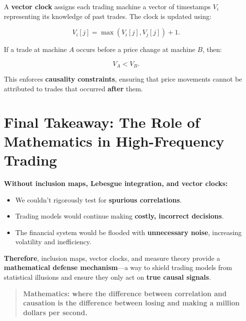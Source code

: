 A \textbf{vector clock} assigns each trading machine a vector of timestamps \( V_i \) representing its knowledge of past trades. The clock is updated using:

\[
V_i[j] = \max(V_i[j], V_j[j]) + 1.
\]

If a trade at machine \( A \) occurs before a price change at machine \( B \), then:

\[
V_A < V_B.
\]

This enforces \textbf{causality constraints}, ensuring that price movements cannot be attributed to trades that occurred \textbf{after} them.

\section{Final Takeaway: The Role of Mathematics in High-Frequency Trading}

\textbf{Without inclusion maps, Lebesgue integration, and vector clocks:}
\begin{itemize}
    \item We couldn’t rigorously test for \textbf{spurious correlations}.
    \item Trading models would continue making \textbf{costly, incorrect decisions}.
    \item The financial system would be flooded with \textbf{unnecessary noise}, increasing volatility and inefficiency.
\end{itemize}

\textbf{Therefore}, inclusion maps, vector clocks, and measure theory provide a \textbf{mathematical defense mechanism}—a way to shield trading models from statistical illusions and ensure they only act on \textbf{true causal signals}.

\begin{quote}
\textbf{Mathematics: where the difference between correlation and causation is the difference between losing and making a million dollars per second.}
\end{quote}

